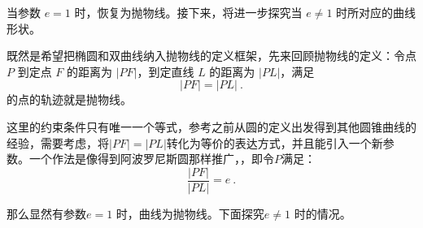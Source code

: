 当参数 $e = 1$ 时，恢复为抛物线。接下来，将进一步探究当 $e \ne 1$ 时所对应的曲线形状。



既然是希望把椭圆和双曲线纳入抛物线的定义框架，先来回顾抛物线的定义：令点 $P$ 到定点 $F$ 的距离为 $|PF|$，到定直线 $L$ 的距离为 $|PL|$，满足
\begin{equation}
|PF| = |PL|~.
\end{equation}
的点的轨迹就是抛物线。

这里的约束条件只有唯一一个等式，参考之前从圆的定义出发得到其他圆锥曲线的经验，需要考虑，将$|PF|=|PL|$转化为等价的表达方式，并且能引入一个新参数。一个作法是像得到阿波罗尼斯圆那样推广，，即令$P$满足：
\begin{equation}\label{eq_HsCsFD_1}
\frac{|PF|}{|PL|} = e~.
\end{equation}

那么显然有参数$e = 1$ 时，曲线为抛物线。下面探究$e \ne 1$ 时的情况。

